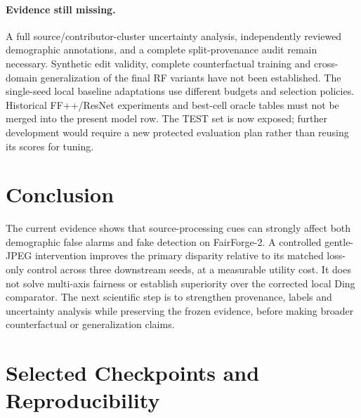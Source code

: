 \documentclass[10pt,twocolumn,letterpaper]{article}
\begin{document}
\paragraph{Evidence still missing.}
A full source/contributor-cluster uncertainty analysis, independently reviewed demographic annotations,
and a complete split-provenance audit remain necessary. Synthetic edit validity, complete counterfactual
training and cross-domain generalization of the final RF variants have not been established.
The single-seed local baseline adaptations use different budgets and selection policies. Historical
FF++/ResNet experiments and best-cell oracle tables must not be merged into the present model row.
The TEST set is now exposed; further development would require a new protected evaluation plan rather than
reusing its scores for tuning.

\section{Conclusion}
The current evidence shows that source-processing cues can strongly affect both demographic false alarms
and fake detection on FairForge-2. A controlled gentle-JPEG intervention improves the primary disparity
relative to its matched loss-only control across three downstream seeds, at a measurable utility cost.
It does not solve multi-axis fairness or establish superiority over the corrected local Ding comparator.
The next scientific step is to strengthen provenance, labels and uncertainty analysis while preserving the
frozen evidence, before making broader counterfactual or generalization claims.

{\small}

\clearpage
\appendix
\section{Selected Checkpoints and Reproducibility}
\begin{table}[h]
\centering\small

\caption{Selected SELECT results from the exact checkpoints in the recorded TEST freeze. Every run completed
ten epochs. Different selected epochs reflect the fixed feasibility/selection rule, not unequal planned budgets.}
\end{table}

\begin{table}[h]
\centering\small
\caption{TEST image counts shared by the evaluated checkpoints. These counts do not certify independent people.}
\end{table}
\end{document}
